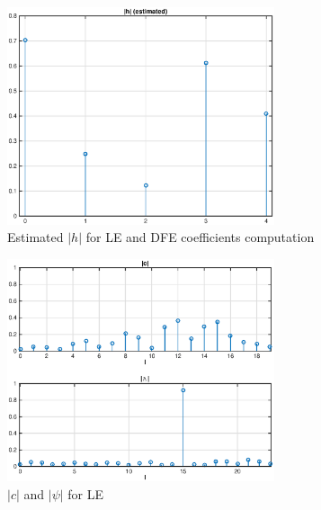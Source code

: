\documentclass[10pt]{article}
\begin{document}
\begin{figure}[h!]
	\centering
	\includegraphics[width=0.7\textwidth]{h_LEDFE}
	\caption{Estimated $|h|$ for LE and DFE coefficients computation}
	\label{fig:hledfe}
\end{figure}

\begin{figure}[h!]
	\centering
	\includegraphics[width = 0.7\textwidth]{cphiLE}
	\caption{$|c|$ and $|\psi|$ for LE}
	\label{fig:LEcoeff}
\end{figure}
\end{document}
